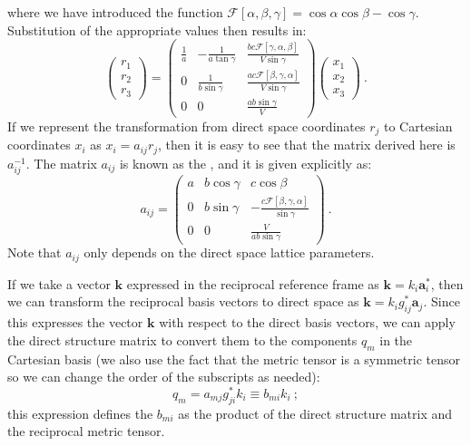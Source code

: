 where we have introduced the function $\mathcal{F}[\alpha,\beta,\gamma]=\cos\alpha\cos\beta-\cos\gamma$. Substitution of the appropriate values then results in:
\begin{equation}
	\begin{pmatrix}r_1\\ r_2\\ r_3\end{pmatrix} = \begin{pmatrix} \frac{1}{a} & - \frac{1}{a\tan\gamma}& \frac{bc\mathcal{F}[\gamma,\alpha,\beta]}{V\sin\gamma} \\
	0 & \frac{1}{b\sin\gamma}& \frac{ac\mathcal{F}[\beta,\gamma,\alpha]}{V\sin\gamma}  \\
	0&0&\frac{ab\sin\gamma}{V}\end{pmatrix}\begin{pmatrix}x_1\\ x_2\\ x_3\end{pmatrix}\ .\label{\chabbr:eq:ainverse}
\end{equation}
If we represent the transformation from direct space coordinates $r_j$ to Cartesian coordinates $x_i$ as $x_i=a_{ij}r_j$, then it is easy to see that the matrix derived here is $a^{-1}_{ij}$.  The matrix $a_{ij}$ is known as the , and it is given explicitly as:
\begin{equation}
	a_{ij} = \begin{pmatrix}a & b \cos\gamma & c \cos\beta\\
	0 & b\sin\gamma & -\frac{c\mathcal{F}[\beta,\gamma,\alpha]}{\sin\gamma}\\
	0&0&\frac{V}{ab\sin\gamma}\end{pmatrix}\ .\label{\chabbr:eq:dsm}
\end{equation}
Note that $a_{ij}$ only depends on the direct space lattice parameters.

If we take a vector $\mathbf{k}$ expressed in the reciprocal reference frame as $\mathbf{k}=k_i\mathbf{a}^{\ast}_i$, then we can transform the reciprocal basis vectors to direct space as $\mathbf{k}=k_i g^{\ast}_{ij}\mathbf{a}_j$.  Since this expresses the vector $\mathbf{k}$ with respect to the direct basis vectors, we can apply the direct structure matrix to convert them to the components $q_m$ in the Cartesian basis (we also use the fact that the metric tensor is a symmetric tensor so we can change the order of the subscripts as needed):
\[
	q_m = a_{mj} g^{\ast}_{ji} k_i \equiv b_{mi} k_i\ ;
\]
this expression defines the  $b_{mi}$ as the product of the direct structure matrix and the reciprocal metric tensor.

